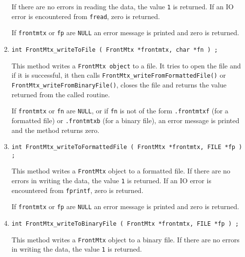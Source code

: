 \begin{enumerate}
If there are no errors in reading the data,
the value {\tt 1} is returned.
If an IO error is encountered from {\tt fread}, zero is returned.
\par {}
If {\tt frontmtx} or {\tt fp} are {\tt NULL} an error message
is printed and zero is returned.
\item
\begin{verbatim}
int FrontMtx_writeToFile ( FrontMtx *frontmtx, char *fn ) ;
\end{verbatim}
\par
This method writes a {\tt FrontMtx object} to a file.
It tries to open the file and if it is successful,
it then calls {\tt FrontMtx\_writeFromFormattedFile()} or
{\tt FrontMtx\_writeFromBinaryFile()},
closes the file
and returns the value returned from the called routine.
\par {}
If {\tt frontmtx} or {\tt fn} are {\tt NULL},
or if {\tt fn} is not of the form
{\tt *.frontmtxf} (for a formatted file)
or {\tt *.frontmtxb} (for a binary file),
an error message is printed and the method returns zero.
\item
\begin{verbatim}
int FrontMtx_writeToFormattedFile ( FrontMtx *frontmtx, FILE *fp ) ;
\end{verbatim}
\par
This method writes a {\tt FrontMtx} object to a formatted file.
If there are no errors in writing the data,
the value {\tt 1} is returned.
If an IO error is encountered from {\tt fprintf}, zero is returned.
\par {}
If {\tt frontmtx} or {\tt fp} are {\tt NULL} an error message
is printed and zero is returned.
\item
\begin{verbatim}
int FrontMtx_writeToBinaryFile ( FrontMtx *frontmtx, FILE *fp ) ;
\end{verbatim}
\par
This method writes a {\tt FrontMtx} object to a binary file.
If there are no errors in writing the data,
the value {\tt 1} is returned.

\end{enumerate}
